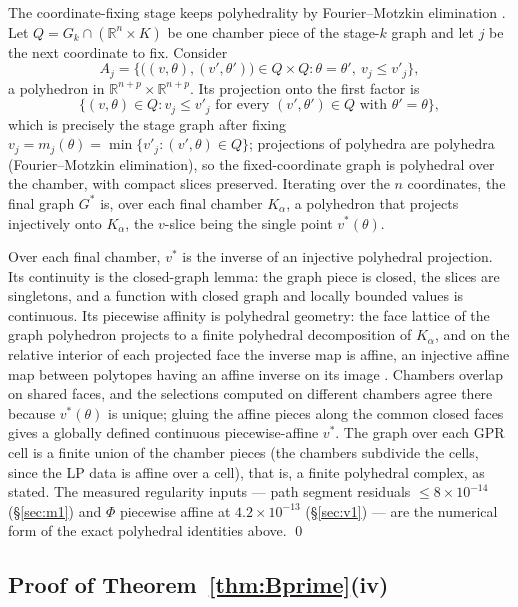 \documentclass[11pt,a4paper]{article}
\theoremstyle{plain}
\theoremstyle{definition}
\theoremstyle{remark}
\newcommand{\RR}{\mathbb{R}}
\begin{document}
The coordinate-fixing stage keeps polyhedrality by Fourier--Motzkin
elimination \citep{ziegler1995}. Let $Q = G_k \cap (\RR^{n} \times
K)$ be one chamber piece of the stage-$k$ graph and let $j$ be the
next coordinate to fix. Consider
\[
A_j = \bigl\{\bigl((v,\theta), (v',\theta')\bigr) \in Q \times Q :
\theta = \theta',\ v_j \le v'_j\bigr\},
\]
a polyhedron in $\RR^{n+p} \times \RR^{n+p}$. Its projection onto
the first factor is
\[
\bigl\{(v, \theta) \in Q : v_j \le v'_j \text{ for every }
(v', \theta') \in Q \text{ with } \theta' = \theta\bigr\},
\]
which is precisely the stage graph after fixing
$v_j = m_j(\theta) = \min\{v'_j : (v',\theta) \in Q\}$; projections
of polyhedra are polyhedra (Fourier--Motzkin elimination), so the
fixed-coordinate graph is polyhedral over the chamber, with compact
slices preserved. Iterating over the $n$ coordinates, the final
graph $G^{*}$ is, over each final chamber $K_{\alpha}$, a polyhedron
that projects injectively onto $K_{\alpha}$, the $v$-slice being the
single point $v^{*}(\theta)$.

Over each final chamber, $v^{*}$ is the inverse of an injective
polyhedral projection. Its continuity is the closed-graph lemma: the
graph piece is closed, the slices are singletons, and a function
with closed graph and locally bounded values is continuous. Its
piecewise affinity is polyhedral geometry: the face lattice of the
graph polyhedron projects to a finite polyhedral decomposition of
$K_{\alpha}$, and on the relative interior of each projected face
the inverse map is affine, an injective affine map between polytopes
having an affine inverse on its image \citep{ziegler1995}. Chambers
overlap on shared faces, and the selections computed on different
chambers agree there because $v^{*}(\theta)$ is unique; gluing the
affine pieces along the common closed faces gives a globally
defined continuous piecewise-affine $v^{*}$. The graph over each GPR
cell is a finite union of the chamber pieces (the chambers subdivide
the cells, since the LP data is affine over a cell), that is, a
finite polyhedral complex, as stated. The measured regularity inputs
--- path segment residuals $\le 8 \times 10^{-14}$
(\S\ref{sec:m1}) and $\Phi$ piecewise affine at $4.2 \times
10^{-13}$ (\S\ref{sec:v1}) --- are the numerical form of the exact
polyhedral identities above. \qed

\subsection{Proof of Theorem~\ref{thm:Bprime}(iv)}
\end{document}
